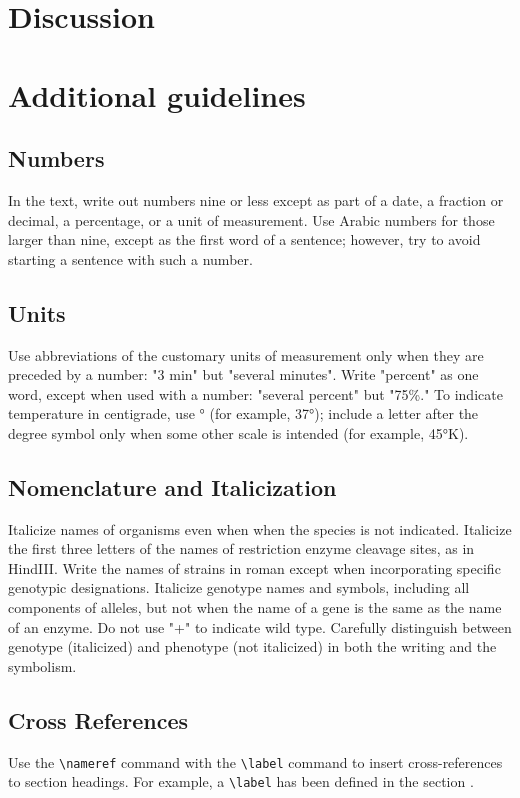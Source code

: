 \documentclass[9pt,twocolumn,twoside,lineno]{gsajnl}
\begin{document}
\section{Discussion}



\section{Additional guidelines}

\subsection{Numbers} In the text, write out numbers nine or less except as part of a date, a fraction or decimal, a percentage, or a unit of measurement. Use Arabic numbers for those larger than nine, except as the first word of a sentence; however, try to avoid starting a sentence with such a number.

\subsection{Units} Use abbreviations of the customary units of measurement only when they are preceded by a number: "3 min" but "several minutes". Write "percent" as one word, except when used with a number: "several percent" but "75\%." To indicate temperature in centigrade, use ° (for example, 37°); include a letter after the degree symbol only when some other scale is intended (for example, 45°K).

\subsection{Nomenclature and Italicization} Italicize names of organisms even when  when the species is not indicated.  Italicize the first three letters of the names of restriction enzyme cleavage sites, as in HindIII. Write the names of strains in roman except when incorporating specific genotypic designations. Italicize genotype names and symbols, including all components of alleles, but not when the name of a gene is the same as the name of an enzyme. Do not use "+" to indicate wild type. Carefully distinguish between genotype (italicized) and phenotype (not italicized) in both the writing and the symbolism.

\subsection{Cross References}
Use the \verb|\nameref| command with the \verb|\label| command to insert cross-references to section headings. For example, a \verb|\label| has been defined in the section .
\end{document}
